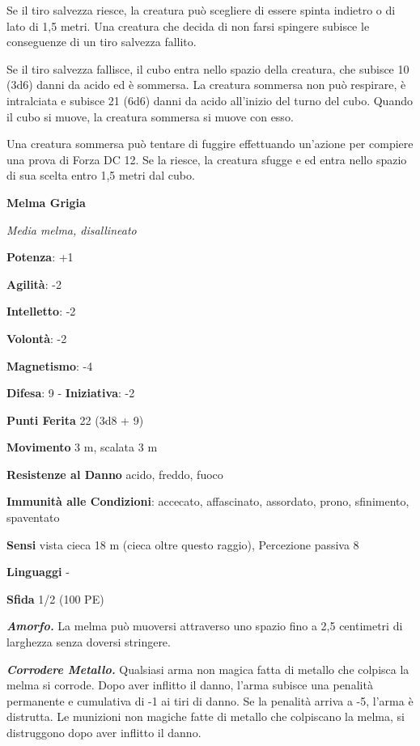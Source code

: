 \begin{multicols}{2}
Se il tiro salvezza riesce, la creatura può scegliere di essere spinta
indietro o di lato di 1,5 metri. Una creatura che decida di non farsi
spingere subisce le conseguenze di un tiro salvezza fallito.

Se il tiro salvezza fallisce, il cubo entra nello spazio della creatura,
che subisce 10 (3d6) danni da acido ed è sommersa. La creatura sommersa
non può respirare, è intralciata e subisce 21 (6d6) danni da acido
all'inizio del turno del cubo. Quando il cubo si muove, la creatura
sommersa si muove con esso.

Una creatura sommersa può tentare di fuggire effettuando un'azione per
compiere una prova di Forza DC 12. Se la riesce, la creatura sfugge e ed
entra nello spazio di sua scelta entro 1,5 metri dal cubo.

\textbf{Melma Grigia}

\emph{Media melma, disallineato}

\textbf{Potenza}: +1

\textbf{Agilità}: -2

\textbf{Intelletto}: -2

\textbf{Volontà}: -2

\textbf{Magnetismo}: -4

\textbf{Difesa}: 9 - \textbf{Iniziativa}: -2

\textbf{Punti Ferita} 22 (3d8 + 9)

\textbf{Movimento} 3 m, scalata 3 m

\textbf{Resistenze al Danno} acido, freddo, fuoco

\textbf{Immunità alle Condizioni}: accecato, affascinato, assordato,
prono, sfinimento, spaventato

\textbf{Sensi} vista cieca 18 m (cieca oltre questo raggio), Percezione
passiva 8

\textbf{Linguaggi} -

\textbf{Sfida} 1/2 (100 PE)\smallskip

\emph{\textbf{Amorfo.}} La melma può muoversi attraverso uno spazio fino
a 2,5 centimetri di larghezza senza doversi stringere.

\emph{\textbf{Corrodere Metallo.}} Qualsiasi arma non magica fatta di
metallo che colpisca la melma si corrode. Dopo aver inflitto il danno,
l'arma subisce una penalità permanente e cumulativa di -1 ai tiri di
danno. Se la penalità arriva a -5, l'arma è distrutta. Le munizioni non
magiche fatte di metallo che colpiscano la melma, si distruggono dopo
aver inflitto il danno.


\end{multicols}

